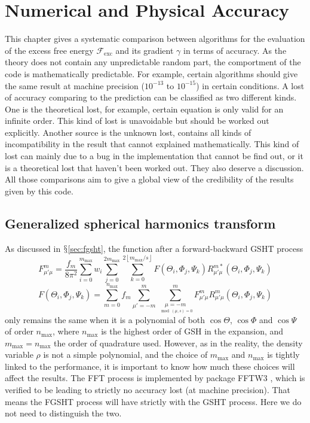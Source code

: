 
\chapter{Numerical and Physical Accuracy\label{chpt:accuracy}}

This chapter gives a systematic comparison between algorithms for
the evaluation of the excess free energy $\mathcal{F}_{\mathrm{exc}}$
and its gradient $\gamma$ in terms of accuracy. As the theory does
not contain any unpredictable random part, the comportment of the
code is mathematically predictable. For example, certain algorithms
should give the same result at machine precision ($10^{-13}$ to $10^{-15}$)
in certain conditions. A lost of accuracy comparing to the prediction
can be classified as two different kinds. One is the theoretical lost,
for example, certain equation is only valid for an infinite order.
This kind of lost is unavoidable but should be worked out explicitly.
Another source is the unknown lost, contains all kinds of incompatibility
in the result that cannot explained mathematically. This kind of lost
can mainly due to a bug in the implementation that cannot be find
out, or it is a theoretical lost that haven't been worked out. They
also deserve a discussion. All those comparisons aim to give a global
view of the credibility of the results given by this code.

\section{Generalized spherical harmonics transform\label{sec:gsh-imp}}

As discussed in $\mathsection$\ref{sec:fgsht}, the function after
a forward-backward \acs{GSHT} process 
\begin{equation}
F_{\mu'\mu}^{m}=\frac{f_{m}}{8\pi^{2}}\sum_{i=0}^{m_{\mathrm{max}}}w_{i}\sum_{j=0}^{2m_{\mathrm{max}}}\sum_{k=0}^{2\left\lfloor m_{\mathrm{max}}/s\right\rfloor }F(\Theta_{i},\Phi_{j},\Psi_{k})R_{\mu'\mu}^{m*}(\Theta_{i},\Phi_{j},\Psi_{k})
\end{equation}
\begin{equation}
F(\Theta_{i},\Phi_{j},\Psi_{k})=\sum_{m=0}^{n_{\mathrm{max}}}f_{m}\sum_{\mu'=-m}^{m}\sum_{\underset{\mod(\mu,s)=0}{\mu=-m}}^{m}F_{\mu'\mu}^{m}R_{\mu'\mu}^{m}(\Theta_{i},\Phi_{j},\Psi_{k})
\end{equation}
only remains the same when it is a polynomial of both $\cos\Theta$,
$\cos\Phi$ and $\cos\Psi$ of order $n_{\max}$, where $n_{\max}$
is the highest order of \acs{GSH} in the expansion, and $m_{\max}=n_{\max}$
the order of quadrature used. However, as in the reality, the density
variable $\rho$ is not a simple polynomial, and the choice of $m_{\max}$
and $n_{\max}$ is tightly linked to the performance, it is important
to know how much these choices will affect the results. The \acs{FFT}
process is implemented by package FFTW3 \citep{FFTW3}, which is verified
to be leading to strictly no accuracy lost (at machine precision).
That means the \acs{FGSHT} process will have strictly with the \acs{GSHT}
process. Here we do not need to distinguish the two.

